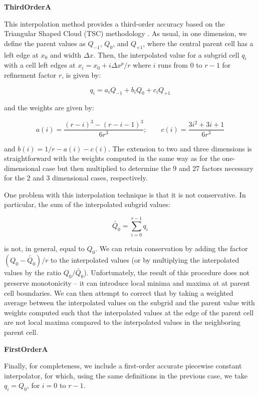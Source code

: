 
\vspace{0.3cm}\noindent
{\bf ThirdOrderA} 

This interpolation method provides a third-order accuracy based on the
Triangular Shaped Cloud (TSC) methodology \citep{Hockney88}.  As
usual, in one dimension, we define the parent values as $Q_{-1}$,
$Q_0$, and $Q_{+1}$, where the central parent cell has a left edge at
$x_0$ and width $\Delta x$.  Then, the interpolated value for a
subgrid cell $q_i$ with a cell left edges at $x_i = x_0 + i \Delta
x^p/r$ where $i$ runs from 0 to $r-1$ for refinement factor $r$, is
given by:

\begin{equation}
q_i = a_i  Q_{-1} + b_i Q_0 + c_i Q_{+1}
\end{equation}

and the weights are given by:

\begin{equation}
a(i) =  \frac{(r-i)^3 - (r-i-1)^3}{6r^3}; \qquad c(i) = \frac{3i^2 + 3i + 1}{6r^3}
\end{equation}

and $b(i) = 1/r - a(i) - c(i)$.  The extension to two and three
dimensions is straightforward with the weights computed in the same
way as for the one-dimensional case but then multiplied to determine
the 9 and 27 factors necessary for the 2 and 3 dimensional cases,
respectively.

One problem with this interpolation technique is that it is not
conservative.  In particular, the sum of the interpolated subgrid
values:

\begin{equation}
\tilde{Q_0} = \sum_{i=0}^{r-1} q_i
\end{equation}

is not, in general, equal to $Q_0$.  We can retain conservation by
adding the factor $(Q_0 - \tilde{Q_0})/r$ to the interpolated values
(or by multiplying the interpolated values by the ratio
$Q_0/\tilde{Q_0}$).  Unfortunately, the result of this procedure does
not preserve monotonicity -- it can introduce local minima and maxima
at at parent cell boundaries.  We can then attempt to correct that by
taking a weighted average between the interpolated values on the
subgrid and the parent value with weights computed such that the
interpolated values at the edge of the parent cell are not local
maxima compared to the interpolated values in the neighboring parent
cell.



\vspace{0.3cm}\noindent
{\bf FirstOrderA}

Finally, for completeness, we include a first-order accurate piecewise
constant interpolator, for which, using the same definitions in the
previous case, we take $q_i = Q_0$, for $i = 0$ to $r-1$. 

\vspace{1cm}

